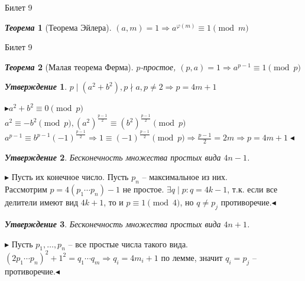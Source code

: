 \documentclass[a4paper,12pt]{article}
\newtheorem{teo}{\textit{Теорема}}
\newtheorem{utv}{\textit{Утверждение}}
\newcommand{\ee}{\equiv}
\newcommand{\FI}{\varphi}
\newcommand{\pb}{\blacktriangleright}
\newcommand{\pe}{\blacktriangleleft}
\newcommand{\Ra}{\Rightarrow}
\begin{document}
\begin{mybox}{\hypertarget{bil9}{Билет 9}}
\begin{formbox}{}
\begin{teo}[Теорема Эйлера] $(a,m) = 1\Ra a^{\FI(m)} \ee 1\pmod{m}$
\end{teo}
\end{formbox}
\end{mybox}
\newpage
\begin{mybox}{{Билет 9}}
\begin{formbox}{}
\begin{teo}[Малая теорема Ферма] $p$-простое, $(p,a) = 1\Ra a^{p-1} \ee 1\pmod{p}$
\end{teo}
\end{formbox}
\begin{formbox}{}
\begin{utv} $p\mid (a^2+b^2), p\nmid a, p\not=2 \Ra p = 4m+1$
\end{utv}
\end{formbox}
$\pb a^2 + b^2 \ee 0\pmod{p}$\\
$a^2 \ee -b^2\pmod{p}, (a^2)^{\frac{p-1}{2}} \ee (b^2)^{\frac{p-1}{2}}\pmod{p}$\\
$a^{p-1}\ee b^{p-1} (-1)^{\frac{p-1}{2}} \Ra 1 \ee (-1)^{\frac{p-1}{2}}\pmod{p}\Ra \frac{p-1}{2} = 2m\Ra p = 4m+1\pe$

\begin{formbox}{}
\begin{utv} Бесконечность множества простых вида $4n-1$.
\end{utv}
\end{formbox}
$\pb $ Пусть их конечное число. Пусть $p_n$ -- максимальное из них.\\
Рассмотрим $p = 4(p_1\cdots p_n) - 1$ не простое. $\exists q\mid p:q = 4k-1$, т.к. если все делители имеют вид $4k+1$, то и $p \ee 1 \pmod{4}$, но $q \not= p_j$ противоречие.$\pe$

\begin{formbox}{}
\begin{utv} Бесконечность множества простых вида $4n+1$.
\end{utv}
\end{formbox}
$\pb $ Пусть $p_1,\dots,p_n$ -- все простые числа такого вида.\\
$(2p_1\cdots p_n)^2 + 1^2 = q_1\cdots q_m \Ra q_i = 4m_i+1$ по лемме, значит $q_i = p_j$ -- противоречие.$\pe$ 
\end{mybox}
\end{document}
